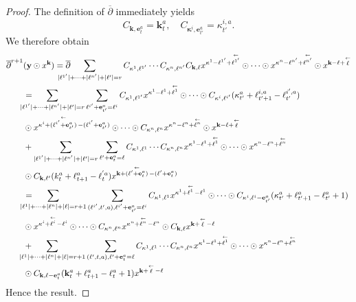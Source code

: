 \documentclass[10pt,a4paper]{amsart}
\def\shift#1{\mathop{#1}^{\leftarrow}\limits}
\begin{document}
\begin{proof}
The definition of $\overline{\partial}$ immediately yields
\[
C_{\mathbf k, \mathbf e_t^a} = \mathbf k_t^a,\quad
C_{\mathbf \kappa^i, \mathbf e_{t'}^a} = \kappa^{i,a}_{t'}.
\]
We therefore obtain
\begin{align*}
\overline{\partial}^{r+1}&( \mathbf  y\odot  x^{\mathbf k})
  =\overline{\partial}\hskip-6mm\sum_{\vert \ell^{1'}\vert + \cdots + \vert \ell^{n'}\vert + \vert \ell'\vert=r} C_{\kappa^1, \ell^{1'}}\cdots C_{\kappa^n, \ell^{n'}}C_{\mathbf k, \ell} x^{\kappa^1 - \ell^{1'} + \shift{\ell^{1'}}}\odot \cdots\odot x^{\kappa^n - \ell^{n'} + \shift{\ell^{n'}}}\odot x^{\mathbf k - \ell + \shift{\ell}}\\
 & =\hskip-6mm\sum_{\vert \ell^{1'}\vert + \cdots + \vert \ell^{n'}\vert + \vert \ell'\vert=r}\sum_{\ell^{i'} + \mathbf e_{t'}^a = \ell^i }C_{\kappa^1, \ell^{1'}} x^{\kappa^1 - \ell^1 + \shift{\ell^1}}\odot \cdots \odot  C_{\kappa^i, \ell^{i'} }(\kappa_{t'}^a + \ell_{t'+1}^{i,a} - \ell_{t'}^{i',a}) \\
 & \odot  x^{\kappa^i + \shift{(\ell^{i'}+ \mathbf e_{t'}^{a}) } - (\ell^{i'} + \mathbf e_{t'}^a)}\odot \cdots \odot C_{\kappa^n, \ell^n} x^{\kappa^n - \ell^n + \shift{\ell^n}}\odot    x^{\mathbf k - \ell + \shift{\ell}}\\
 & +\sum_{\vert \ell^{1'}\vert + \cdots + \vert \ell^{n'}\vert + \vert \ell'\vert=r}\sum_{\ell' + \mathbf e_t^a =\ell }C_{\kappa^1, \ell^1}\cdots C_{\kappa^n, \ell^n} x^{\kappa^1 - \ell^1 + \shift{\ell^1}}\odot  \cdots\odot  x^{\kappa^n - \ell^n + \shift{\ell^n}}\\
 & \odot C_{\mathbf k, \ell'}(k_t^a + \ell_{t+1}^a - \ell^{'a}_t)x^{\mathbf k + \shift{(\ell' + \mathbf e_t^a)} - (\ell' + \mathbf e_t^a)}\\
 & =\hskip -6mm \sum_{\vert \ell^{1}\vert + \cdots + \vert \ell^{n}\vert + \vert \ell\vert=r + 1}\sum_{(\ell^{i'}, t', a), \ell^{i'} + \mathbf e_{t'}^a=\ell^i}C_{\kappa^1, \ell^1} x^{\kappa^1 + \shift{\ell^1} - \ell^1}\odot \cdots\odot C_{\kappa^i, \ell^i - \mathbf e_{t'}^a}(\kappa_{t'}^a + \ell_{t'+1}^a - \ell_{t'}^a + 1) \\
 & \odot x^{\kappa^i + \shift{\ell^i} - \ell^i}\odot \cdots \odot C_{\kappa^n, \ell^n} x^{\kappa^n + \shift{\ell^n} - \ell^n}\odot C_{\mathbf k, \ell} x^{\mathbf k + \shift{\ell} - \ell}\\
 & + \hskip-6mm\sum_{\vert \ell^{1}\vert + \cdots + \vert \ell^{n}\vert + \vert \ell\vert=r + 1}\sum_{(\ell', t, a), \ell' + \mathbf e_t^a=\ell} C_{\kappa^1, \ell^1}\cdots C_{\kappa^n, \ell^n} x^{\kappa^1 - \ell^1 + \shift{\ell^1}}\odot \cdots\odot  x^{\kappa^n - \ell^n + \shift{\ell^n}}\\
 &   \odot C_{\mathbf k, \ell - \mathbf e_t^a}(\mathbf k_t^a + \ell_{t+1}^a - \ell_t^a + 1) x^{\mathbf k + \shift{\ell} - \ell}
\end{align*}
Hence the result.
\end{proof}
\end{document}
